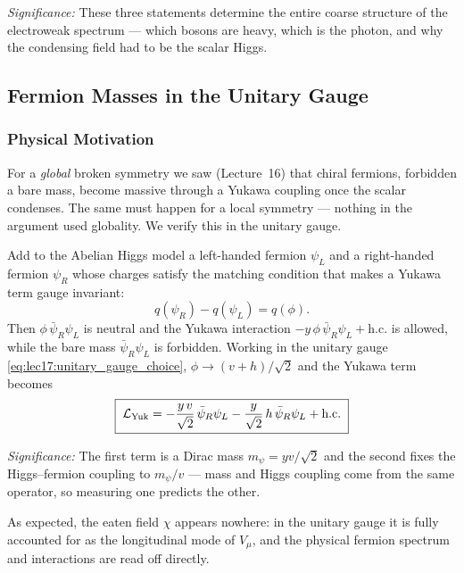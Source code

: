 \textit{Significance:} These three statements determine the entire coarse structure of the electroweak spectrum --- which bosons are heavy, which is the photon, and why the condensing field had to be the scalar Higgs.

\subsection{Fermion Masses in the Unitary Gauge}\label{subsec:lec17:fermion-masses}

\subsubsection*{Physical Motivation}

For a \emph{global} broken symmetry we saw (Lecture~16) that chiral fermions, forbidden a bare mass, become massive through a Yukawa coupling once the scalar condenses. The same must happen for a local symmetry --- nothing in the argument used globality. We verify this in the unitary gauge.

Add to the Abelian Higgs model a left-handed fermion $\psi_L$ and a right-handed fermion $\psi_R$ whose charges satisfy the matching condition that makes a Yukawa term gauge invariant:
\begin{equation}
  q(\psi_R)-q(\psi_L)=q(\phi) .
  \label{eq:lec17:charge_condition}
\end{equation}
Then $\phi\,\bar\psi_R\psi_L$ is neutral and the Yukawa interaction $-y\,\phi\,\bar\psi_R\psi_L+\text{h.c.}$ is allowed, while the bare mass $\bar\psi_R\psi_L$ is forbidden. Working in the unitary gauge \eqref{eq:lec17:unitary_gauge_choice}, $\phi\to(v+h)/\sqrt2$ and the Yukawa term becomes
\begin{equation}
  \boxed{\;
  \mathcal{L}_{\rm Yuk}
  =-\frac{y\,v}{\sqrt2}\,\bar\psi_R\psi_L
   -\frac{y}{\sqrt2}\,h\,\bar\psi_R\psi_L
   +\text{h.c.}
  \;}
  \label{eq:lec17:yukawa_unitary}
\end{equation}

\textit{Significance:} The first term is a Dirac mass $m_\psi=yv/\sqrt2$ and the second fixes the Higgs--fermion coupling to $m_\psi/v$ --- mass and Higgs coupling come from the same operator, so measuring one predicts the other.

As expected, the eaten field $\chi$ appears nowhere: in the unitary gauge it is fully accounted for as the longitudinal mode of $V_\mu$, and the physical fermion spectrum and interactions are read off directly.

